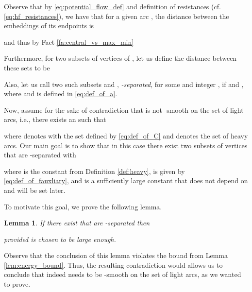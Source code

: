\documentclass[11pt, letterpaper]{article}
\newtheorem{lemma}[theorem]{Lemma}
\begin{document}
Observe that by \eqref{eq:potential_flow_def} and definition of resistances  (cf. \eqref{eq:hf_resistances}), we have that for a given arc , the distance  between the embeddings of its endpoints is 

and thus by Fact \ref{fa:central_vs_max_min}

Furthermore, for two subsets  of vertices of , let us define the distance  between these sets to be

Also, let us call two such subsets  and , {\em -separated}, for some  and integer , if  and , where  and  is defined in \eqref{eq:def_of_a}.


Now, assume for the sake of contradiction that  is not -smooth on the set of light arcs, i.e., there exists an  such that

where  denotes  with the set  defined by \eqref{eq:def_of_C} and  denotes the set of heavy arcs. Our main goal is to show that in this case there exist two subsets  of vertices that are -separated with 

where  is the constant from Definition \ref{def:heavy},  is given by \eqref{eq:def_of_fauxliary}, and   is a sufficiently large constant that does not depend on  and will be set later.

To motivate this goal, we prove the following lemma.


\begin{lemma}
\label{lem:separated_sets}
If there exist  that are -separated then 

provided  is chosen to be large enough.
\end{lemma}

Observe that the conclusion of this lemma violates the bound from Lemma \ref{lem:energy_bound}. Thus, the resulting contradiction would allows us to conclude that  indeed needs to be -smooth on the set of light arcs, as we wanted to prove. 
\end{document}
